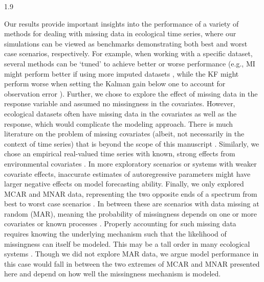 \documentclass[12pt,english]{article} %
\providecommand{\DIFdelend}{} %
\DeclareRobustCommand{\DIFdelend}{\DIFOaddend \let\includegraphics\DIFOincludegraphics} %
\begin{document}
\begin{linenumbers}
\begin{spacing}{1.9}
\begin{flushleft}
\DIFdelend \hspace{1em} Our results provide important insights into the performance of a variety of methods for dealing with missing data in ecological time series, where our simulations can be viewed as benchmarks demonstrating both best and worst case scenarios, respectively. For example, when working with a specific dataset, several methods can be `tuned' to achieve better or worse performance (e.g., MI might perform better if using more imputed datasets \citep{honaker_what_2010}, while the KF might perform worse when setting the Kalman gain below one to account for observation error \citep{kalman_filter_1960}). Further, we chose to explore the effect of missing data in the response variable and assumed no missingness in the covariates. However, ecological datasets often have missing data in the covariates as well as the response, which would complicate the modeling approach. There is much literature on the problem of missing covariates (albeit, not necessarily in the context of time series) that is beyond the scope of this manuscript \citep{Little_1992}.
Similarly, we chose an empirical real-valued time series with known, strong effects from environmental covariates \citep{hall_turbidity_2015,bernhardt2022light}.
In more exploratory scenarios or systems with weaker covariate effects, inaccurate estimates of autoregressive parameters might have larger negative effects on model forecasting ability. Finally, we only explored MCAR and MNAR data, representing the two opposite ends of a spectrum from best to worst case scenarios \citep{newman_missing_2014}. In between these are scenarios with data missing at random (MAR), meaning the probability of missingness depends on one or more covariates or known processes \citep{newman_missing_2014}. Properly accounting for such missing data requires knowing the underlying mechanism such that the likelihood of missingness can itself be modeled. This may be a tall order in many ecological systems \citep[e.g.,][]{Sotto2011_mnar, McCall2014_mnar, Shoari2018_mnar}. Though we did not explore MAR data, we argue model performance in this case would fall in between the two extremes of MCAR and MNAR presented here and depend on how well the missingness mechanism is modeled. 

\end{flushleft}
\end{spacing}
\end{linenumbers}
\end{document}
